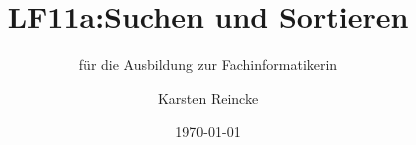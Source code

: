\documentclass[]{beamer}
\title{LF11a:Suchen und Sortieren}
\subtitle{für die Ausbildung zur Fachinformatikerin}
\institute[GS-LDK]{Gewerbliche Schulen Dillenburg}
\author{Karsten Reincke}
\date{\today}
\def\cfgGl{../../../cfg.gl/}
\begin{document}

\begin{frame}
  \titlepage

  
\end{frame}






\logo{}
\newpage



%
\end{document}
